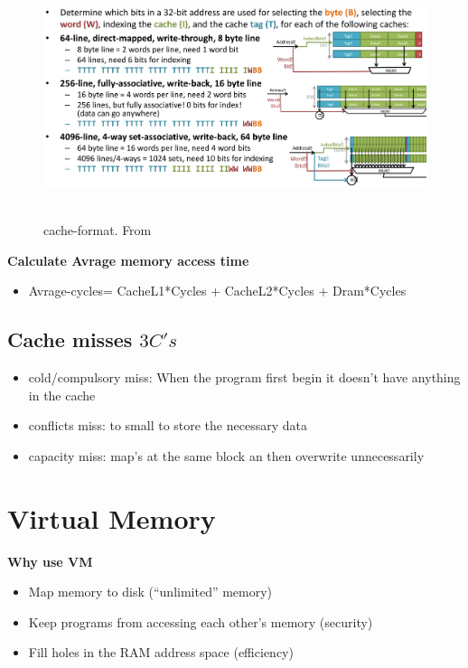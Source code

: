 \begin{figure}[h]
    \vspace{10mm}
    \centering
    \includegraphics[width=16cm, height=7cm]{image/cache-format.png}
    \caption{cache-format. From \cite{}}
\end{figure}


\textbf{Calculate Avrage memory access time}
\begin{itemize}
\item  Avrage-cycles= CacheL1*Cycles + CacheL2*Cycles + Dram*Cycles
\end{itemize}

\subsection{Cache misses $3C's$}
\begin{itemize}
\item  cold/compulsory miss: When the program first begin it doesn't have anything in the cache
\item  conflicts miss: to small to store the necessary data
\item  capacity miss: map's at the same block an then overwrite unnecessarily 
\end{itemize}


\newpage


\section{Virtual Memory}
\textbf{Why use VM}
\begin{itemize}
\item  Map memory to disk (“unlimited” memory)
\item  Keep programs from accessing each other’s memory (security)
\item  Fill holes in the RAM address space (efficiency)
\end{itemize}

